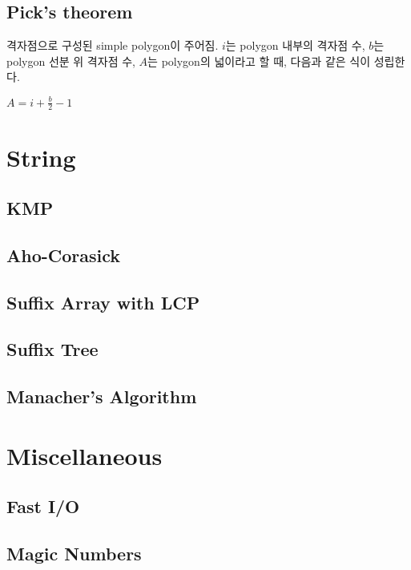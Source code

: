 \documentclass[10pt,landscape,a4paper,twocolumn]{article}
\begin{document}
\subsection{Pick's theorem}

격자점으로 구성된 simple polygon이 주어짐. $i$는 polygon 내부의 격자점 수, $b$는 polygon 선분 위 격자점 수, $A$는 polygon의 넓이라고 할 때, 다음과 같은 식이 성립한다.

$A = i + \frac{b}{2} - 1$

\section{String}

\subsection{KMP}


\subsection{Aho-Corasick}


\subsection{Suffix Array with LCP}

\subsection{Suffix Tree}

\subsection{Manacher's Algorithm}



\section{Miscellaneous}

\subsection{Fast I/O}


\subsection{Magic Numbers}
\end{document}
